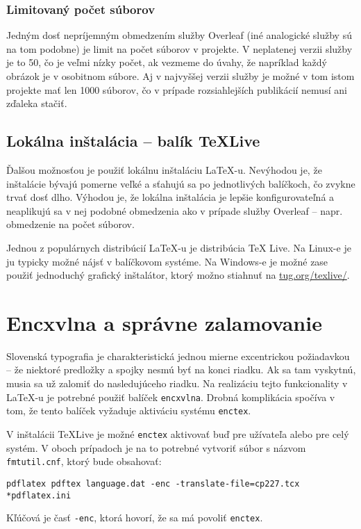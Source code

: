 \subsubsection{Limitovaný počet súborov}

Jedným dosť nepríjemným obmedzením služby Overleaf (iné analogické služby sú na tom podobne) je limit na počet súborov v projekte. V neplatenej verzii služby je to 50, čo je veľmi nízky počet, ak vezmeme do úvahy, že napríklad každý obrázok je v osobitnom súbore. Aj v najvyššej verzii služby je možné v tom istom projekte mať len 1000 súborov, čo v prípade rozsiahlejších publikácií nemusí ani zďaleka stačiť.

\subsection{Lokálna inštalácia -- balík TeXLive}

Ďalšou možnosťou je použiť lokálnu inštaláciu LaTeX-u. Nevýhodou je, že inštalácie bývajú pomerne veľké a sťahujú sa po jednotlivých balíčkoch, čo zvykne trvať dosť dlho. Výhodou je, že lokálna inštalácia je lepšie konfigurovateľná a neaplikujú sa v nej podobné obmedzenia ako v prípade služby Overleaf -- napr. obmedzenie na počet súborov.

Jednou z populárnych distribúcií LaTeX-u je distribúcia TeX Live. Na Linux-e je ju typicky možné nájsť v balíčkovom systéme. Na Windows-e je možné zase použiť jednoduchý grafický inštalátor, ktorý možno stiahnuť na \href{https://www.tug.org/texlive/}{tug.org/texlive/}.

\section{Encxvlna a správne zalamovanie}

Slovenská typografia je charakteristická jednou mierne excentrickou požiadavkou -- že niektoré predložky a spojky nesmú byť na konci riadku. Ak sa tam vyskytnú, musia sa už zalomiť do nasledujúceho riadku. Na realizáciu tejto funkcionality v LaTeX-u je potrebné použiť balíček \texttt{encxvlna}. Drobná komplikácia spočíva v tom, že tento balíček vyžaduje aktiváciu systému \texttt{enctex}.

V inštalácii TeXLive je možné \texttt{enctex} aktivovať buď pre užívateľa alebo pre celý systém. V oboch prípadoch je na to potrebné vytvoriť súbor s názvom \texttt{fmtutil.cnf}, ktorý bude obsahovať:
\begin{Verbatim}
pdflatex pdftex language.dat -enc -translate-file=cp227.tcx *pdflatex.ini
\end{Verbatim}
Kľúčová je časť \texttt{-enc}, ktorá hovorí, že sa má povoliť \texttt{enctex}.

